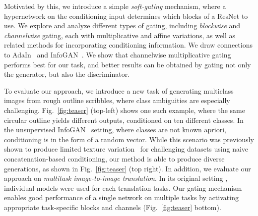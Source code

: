 Motivated by this, we introduce a simple {\em soft-gating} mechanism, where a hypernetwork on the conditioning input determines which blocks of a ResNet to use.
We explore and analyze different types of gating, including {\em blockwise} and {\em channelwise} gating, each with multiplicative and affine variations, as well as related methods for incorporating conditioning information. We draw connections to AdaIn~\cite{huang2017arbitrary,huang2018multimodal} and InfoGAN~\cite{chen2016infogan}. We show that channelwise multiplicative gating performs best for our task, and better results can be obtained by gating not only the generator, but also the discriminator.

To evaluate our approach, we introduce a new task of generating multiclass images from rough outline scribbles, where class ambiguities are especially challenging. Fig.~\ref{fig:teaser} (top-left) shows one such example, where the same circular outline yields different outputs, conditioned on ten different classes.
In the unsupervised InfoGAN~\cite{chen2016infogan} setting, where classes are not known apriori, conditioning is in the form of a random vector. 
While this scenario was previously shown to produce limited texture variation~\cite{ghosh2017multi} for challenging datasets using naive concatenation-based conditioning, our method is able to produce diverse generations, as shown in Fig.~\ref{fig:teaser} (top right).
In addition, we evaluate our approach on {\em multitask image-to-image translation}. 
In its original setting \cite{isola2016image2image}, individual models were used for each translation tasks. 
Our gating mechanism enables good performance of a single network on multiple tasks by activating appropriate task-specific blocks and channels (Fig.~\ref{fig:teaser} bottom).










